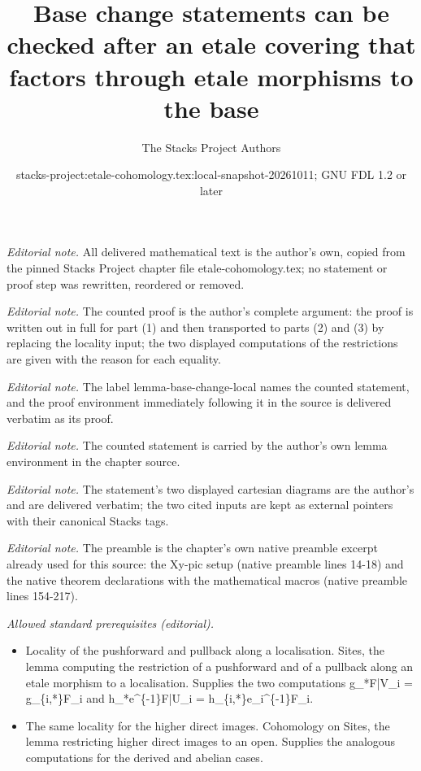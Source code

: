 \documentclass[10pt,a4paper]{amsart}
\title{Base change statements can be checked after an etale covering that factors through etale morphisms to the base}
\author{The Stacks Project Authors}
\date{stacks-project:etale-cohomology.tex:local-snapshot-20261011; GNU FDL 1.2 or later}
\theoremstyle{plain}
\theoremstyle{definition}
\theoremstyle{remark}
\numberwithin{equation}{subsection}
\begin{document}
\maketitle
\noindent\textit{Editorial note.} All delivered mathematical text is the author's own, copied from the pinned Stacks Project chapter file etale-cohomology.tex; no statement or proof step was rewritten, reordered or removed.\par\medskip
\noindent\textit{Editorial note.} The counted proof is the author's complete argument: the proof is written out in full for part (1) and then transported to parts (2) and (3) by replacing the locality input; the two displayed computations of the restrictions are given with the reason for each equality.\par\medskip
\noindent\textit{Editorial note.} The label lemma-base-change-local names the counted statement, and the proof environment immediately following it in the source is delivered verbatim as its proof.\par\medskip
\noindent\textit{Editorial note.} The counted statement is carried by the author's own lemma environment in the chapter source.\par\medskip
\noindent\textit{Editorial note.} The statement's two displayed cartesian diagrams are the author's and are delivered verbatim; the two cited inputs are kept as external pointers with their canonical Stacks tags.\par\medskip
\noindent\textit{Editorial note.} The preamble is the chapter's own native preamble excerpt already used for this source: the Xy-pic setup (native preamble lines 14-18) and the native theorem declarations with the mathematical macros (native preamble lines 154-217).\par\medskip
\noindent\textit{Allowed standard prerequisites (editorial).}\begin{itemize}
\item Locality of the pushforward and pullback along a localisation. Sites, the lemma computing the restriction of a pushforward and of a pullback along an etale morphism to a localisation. Supplies the two computations g\_*F|V\_i = g\_\{i,*\}F\_i and h\_*e\textasciicircum{}\{-1\}F|U\_i = h\_\{i,*\}e\_i\textasciicircum{}\{-1\}F\_i.
\item The same locality for the higher direct images. Cohomology on Sites, the lemma restricting higher direct images to an open. Supplies the analogous computations for the derived and abelian cases.
\end{itemize}\medskip
\end{document}
